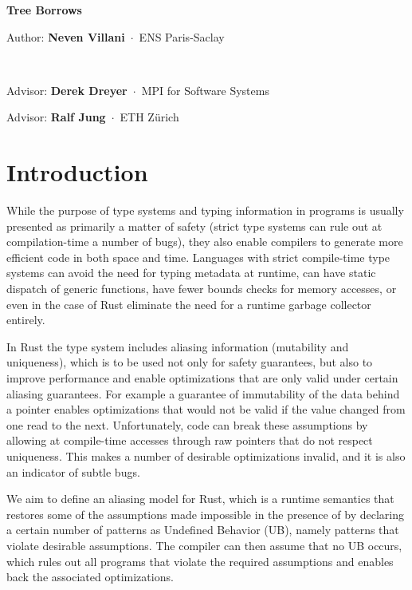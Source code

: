 \documentclass[a4paper,11pt]{article}
\newcommand{\myaff}[1]{\,$\cdot$\, {\small #1}\par\smallskip}
\newcommand{\fakeparagraph}[2]{\par\noindent\textbf{#1}\hspace{1em}#2}
\theoremstyle{plain}
\theoremstyle{definition}
\theoremstyle{remark}
\newcommand{\tcode}[1]{\rstinline{#1}}
\newenvironment{myabstract}
{\list{}{\listparindent 1.5em%
        \itemindent    \listparindent
        \leftmargin    0cm
        \rightmargin   0cm
        \parsep        0pt}%
    \item\relax}
{\endlist}
\newenvironment{mycover}
{\list{}{\listparindent 0pt
        \itemindent    \listparindent
        \leftmargin    0cm
        \rightmargin   0cm
        \parsep        0pt}%
    \raggedright
    \item\relax}
{\endlist}
\begin{document}
\begin{mycover}
{\huge\bfseries\boldmath Tree Borrows\par}
\bigskip
\bigskip
\bigskip


Author: \textbf{Neven Villani}
\myaff{ENS Paris-Saclay}

~\newline

Advisor: \textbf{Derek Dreyer}
\myaff{MPI for Software Systems}


Advisor: \textbf{Ralf Jung}
\myaff{ETH Zürich}


\end{mycover}
\medskip



\section{Introduction}

While the purpose of type systems and typing information in programs is usually
presented as primarily a matter of safety (strict type systems can rule out
at compilation-time a number of bugs), they also enable compilers to generate
more efficient code in both space and time. Languages with strict compile-time
type systems can avoid the need for typing metadata at runtime, can have static
dispatch of generic functions, have fewer bounds checks for memory accesses,
or even in the case of Rust eliminate the need for a runtime garbage collector entirely.

In Rust the type system includes aliasing information (mutability and uniqueness),
which is to be used not only for safety guarantees, but also to improve
performance and enable optimizations that are only valid under certain aliasing
guarantees. For example a guarantee of immutability of the data behind a pointer
enables optimizations that would not be valid if the value changed from one read
to the next.
Unfortunately, \tcode{unsafe} code can break these assumptions by allowing at
compile-time accesses through raw pointers that do not respect uniqueness.
This makes a number of desirable optimizations invalid, and it is also an
indicator of subtle bugs.

We aim to define an aliasing model for Rust, which is a runtime semantics
that restores some of the assumptions made impossible in the presence of \tcode{unsafe}
by declaring a certain number of patterns as Undefined Behavior (UB), namely
patterns that violate desirable assumptions. The compiler can then assume
that no UB occurs, which rules out all programs that violate the required
assumptions and enables back the associated optimizations.
\end{document}
